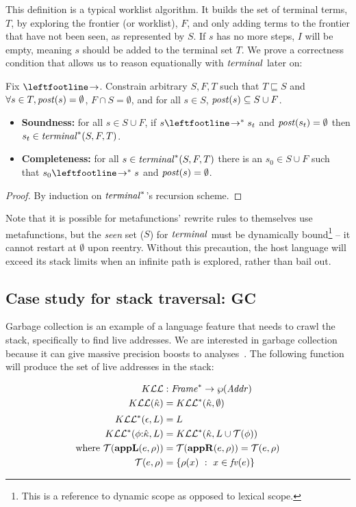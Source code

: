 This definition is a typical worklist algorithm.
%
It builds the set of terminal terms, $T$, by exploring the frontier (or worklist), $F$, and only adding terms to the frontier that have not been seen, as represented by $S$.
%
If $s$ has no more steps, $I$ will be empty, meaning $s$ should be added to the terminal set $T$.
%
We prove a correctness condition that allows us to reason equationally with $\mathit{terminal}$ later on:
\begin{lemma}\label{lem:term-correct}
  Fix $\stepto$. Constrain arbitrary $S, F,T$ such that $T \sqsubseteq S$ and $\forall s\in T, \mathit{post}(s) = \emptyset$, $F \cap S = \emptyset$, and for all $s \in S$, $\mathit{post}(s) \subseteq S \cup F$.
  \begin{itemize}
  \item{\textbf{Soundness:} for all $s \in S \cup F$, if $s \stepto^* s_t$ and $\mathit{post}(s_t) = \emptyset$ then $s_t \in \mathit{terminal}^*(S,F,T)$.}
  \item{\textbf{Completeness:} for all $s \in \mathit{terminal}^*(S,F,T)$ there is an $s_0 \in S \cup F$ such that $s_0 \stepto^* s$ and $\mathit{post}(s) = \emptyset$.}
  \end{itemize}
\end{lemma}
\begin{proof}
  By induction on $\mathit{terminal}^*$'s recursion scheme.
\end{proof}

%
Note that it is possible for metafunctions' rewrite rules to themselves use metafunctions, but the \emph{seen} set ($S$) for $\mathit{terminal}$ must be dynamically bound\footnote{This is a reference to dynamic scope as opposed to lexical scope.} -- it cannot restart at $\emptyset$ upon reentry.
%
Without this precaution, the host language will exceed its stack limits when an infinite path is explored, rather than bail out.

\subsection{Case study for stack traversal: GC}
Garbage collection is an example of a language feature that needs to crawl the stack, specifically to find live addresses.
%
We are interested in garbage collection because it can give massive precision boosts to analyses~\citep{dvanhorn:Might:2006:GammaCFA,dvanhorn:Earl2012Introspective}.
%
The following function will produce the set of live addresses in the stack:

\begin{align*}
  K{\mathcal L}{\mathcal L} &: \mathit{Frame}^* \to \wp(\mathit{Addr}) \\
  K{\mathcal L}{\mathcal L}({\hat{\kappa}}) &= K{\mathcal L}{\mathcal L}^*({\hat{\kappa}},\emptyset) \\[2pt]
  K{\mathcal L}{\mathcal L}^*(\epsilon,L) &= L \\
  K{\mathcal L}{\mathcal L}^*(\phi{\tt :} {\hat{\kappa}}, L) &= K{\mathcal L}{\mathcal L}^*({\hat{\kappa}}, L\cup{\mathcal T}(\phi)) \\
  \text{where } {\mathcal T}(\mathbf{appL}(e,\rho)) &= {\mathcal T}(\mathbf{appR}(e,\rho)) = {\mathcal T}(e,\rho) \\
                {\mathcal T}(e,\rho) &= \{ \rho(x)\ :\ x \in \mathit{fv}(e)\}
\end{align*}

